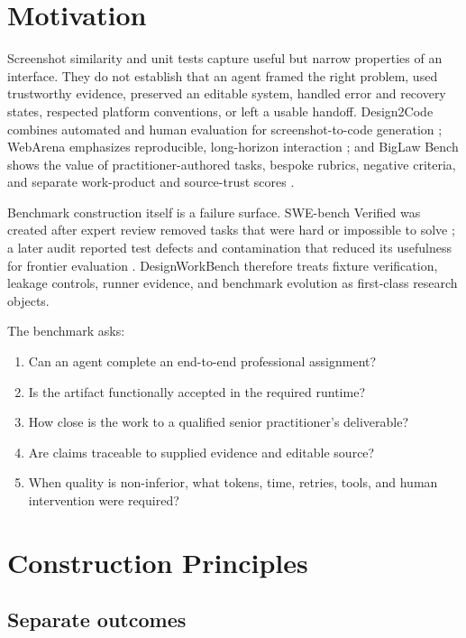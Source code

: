 \documentclass[10pt,twocolumn]{article}
\begin{document}
\section{Motivation}

Screenshot similarity and unit tests capture useful but narrow properties of
an interface. They do not establish that an agent framed the right problem,
used trustworthy evidence, preserved an editable system, handled error and
recovery states, respected platform conventions, or left a usable handoff.
Design2Code combines automated and human evaluation for screenshot-to-code
generation \cite{si2025design2code}; WebArena emphasizes reproducible,
long-horizon interaction \cite{zhou2023webarena}; and BigLaw Bench shows the
value of practitioner-authored tasks, bespoke rubrics, negative criteria, and
separate work-product and source-trust scores \cite{harvey2024biglaw}.

Benchmark construction itself is a failure surface. SWE-bench Verified was
created after expert review removed tasks that were hard or impossible to
solve \cite{openai2024swebench}; a later audit reported test defects and
contamination that reduced its usefulness for frontier evaluation
\cite{openai2026swebench}. DesignWorkBench therefore treats fixture
verification, leakage controls, runner evidence, and benchmark evolution as
first-class research objects.

The benchmark asks:

\begin{enumerate}
  \item Can an agent complete an end-to-end professional assignment?
  \item Is the artifact functionally accepted in the required runtime?
  \item How close is the work to a qualified senior practitioner's deliverable?
  \item Are claims traceable to supplied evidence and editable source?
  \item When quality is non-inferior, what tokens, time, retries, tools, and
  human intervention were required?
\end{enumerate}

\section{Construction Principles}

\subsection{Separate outcomes}
\end{document}
